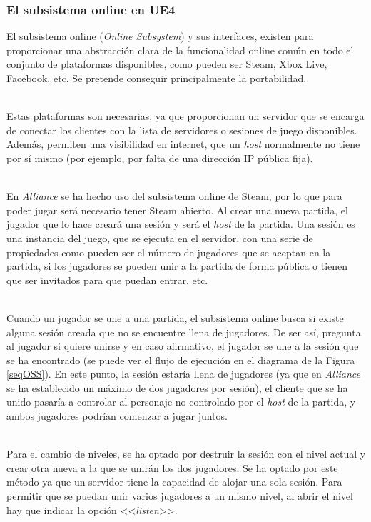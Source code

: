 \subsubsection{El subsistema online en \ac{UE4}}

El subsistema online (\textit{Online Subsystem}) y sus interfaces, existen para proporcionar una abstracción clara de la funcionalidad online común en todo el conjunto de plataformas disponibles, como pueden ser Steam, Xbox Live, Facebook, etc. Se pretende conseguir principalmente la portabilidad.

\\

Estas plataformas son necesarias, ya que proporcionan un servidor que se encarga de conectar los clientes con la lista de servidores o sesiones de juego disponibles. Además, permiten una visibilidad en internet, que un \textit{host} normalmente no tiene por sí mismo (por ejemplo, por falta de una dirección IP pública fija).

\\

En \textit{Alliance} se ha hecho uso del subsistema online de Steam, por lo que para poder jugar será necesario tener Steam abierto. Al crear una nueva partida, el jugador que lo hace creará una sesión y será el \textit{host} de la partida. Una sesión es una instancia del juego, que se ejecuta en el servidor, con una serie de propiedades como pueden ser el número de jugadores que se aceptan en la partida, si los jugadores se pueden unir a la partida de forma pública o tienen que ser invitados para que puedan entrar, etc. 

\\

Cuando un jugador se une a una partida, el subsistema online busca si existe alguna sesión creada que no se encuentre llena de jugadores. De ser así, pregunta al jugador si quiere unirse y en caso afirmativo, el jugador se une a la sesión que se ha encontrado (se puede ver el flujo de ejecución en el diagrama de la Figura \ref{seqOSS}). En este punto, la sesión estaría llena de jugadores (ya que en \textit{Alliance} se ha establecido un máximo de dos jugadores por sesión), el cliente que se ha unido pasaría a controlar al personaje no controlado por el \textit{host} de la partida, y ambos jugadores podrían comenzar a jugar juntos.

\\

Para el cambio de niveles, se ha optado por destruir la sesión con el nivel actual y crear otra nueva a la que se unirán los dos jugadores. Se ha optado por este método ya que un servidor tiene la capacidad de alojar una sola sesión. Para permitir que se puedan unir varios jugadores a un mismo nivel, al abrir el nivel hay que indicar la opción <<\textit{listen}>>.

